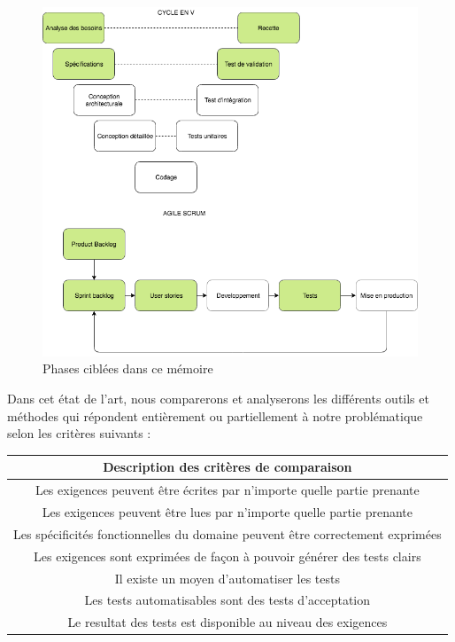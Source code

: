 \begin{figure}[H]
    \centering
    \includegraphics[width=\textwidth]{images/cycles.png}
    \caption{Phases ciblées dans ce mémoire}
\end{figure}

Dans cet état de l'art, nous comparerons et analyserons les différents outils et méthodes qui répondent entièrement ou partiellement à notre problématique selon les critères suivants :

\begin{center}
 \begin{tabular}{||c||} 
 \hline
Description des critères de comparaison \\ [0.5ex] 
 \hline\hline
Les exigences peuvent être écrites par n’importe quelle partie prenante \\ 
 \hline
Les exigences peuvent être lues par n’importe quelle partie prenante\\
 \hline
Les spécificités fonctionnelles du domaine peuvent être correctement exprimées \\
 \hline
Les exigences sont exprimées de façon à pouvoir générer des tests clairs \\
 \hline
Il existe un moyen d’automatiser les tests\\ 
 \hline
 Les tests automatisables sont des tests d’acceptation\\ 
\hline 
 Le resultat des tests est disponible au niveau des exigences\\ [1ex]
\hline 
\end{tabular}
\end{center}

